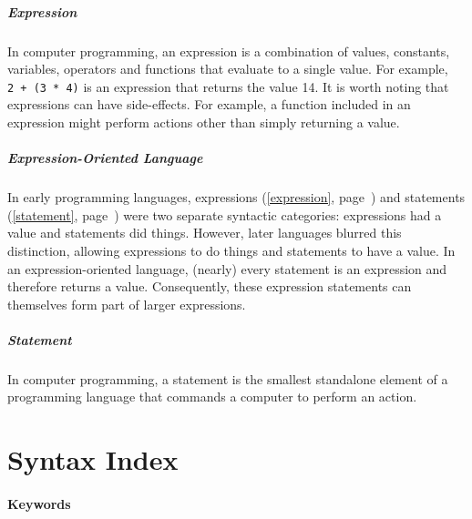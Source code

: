 \documentclass[a4paper,]{book}
\renewcommand*{\hypertarget}[3][\ar]{%
  \def\ar{#2}%
  \label{#1}%
  #3}
\renewcommand*{\hyperlink}[2]{%
 #2 (\autoref{#1}, page~\pageref{#1})}
\let\oldparagraph\paragraph
\renewcommand{\paragraph}[1]{\oldparagraph{#1}\mbox{}}
\begin{document}
\hypertarget{expression}{\paragraph{Expression}\label{expression}}

In computer programming, an expression is a combination of values,
constants, variables, operators and functions that evaluate to a single
value. For example, \texttt{2\ +\ (3\ *\ 4)} is an expression that
returns the value 14. It is worth noting that expressions can have
side-effects. For example, a function included in an expression might
perform actions other than simply returning a value.

\hypertarget{expression-oriented-language}{\paragraph{Expression-Oriented
Language}\label{expression-oriented-language}}

In early programming languages,
\protect\hyperlink{expression}{expressions} and
\protect\hyperlink{statement}{statements} were two separate syntactic
categories: expressions had a value and statements did things. However,
later languages blurred this distinction, allowing expressions to do
things and statements to have a value. In an expression-oriented
language, (nearly) every statement is an expression and therefore
returns a value. Consequently, these expression statements can
themselves form part of larger expressions.

\hypertarget{statement}{\paragraph{Statement}\label{statement}}

In computer programming, a statement is the smallest standalone element
of a programming language that commands a computer to perform an action.

\chapter{Syntax Index}\label{sec--syntax-index}

\subsubsection{Keywords}\label{keywords}
\end{document}

